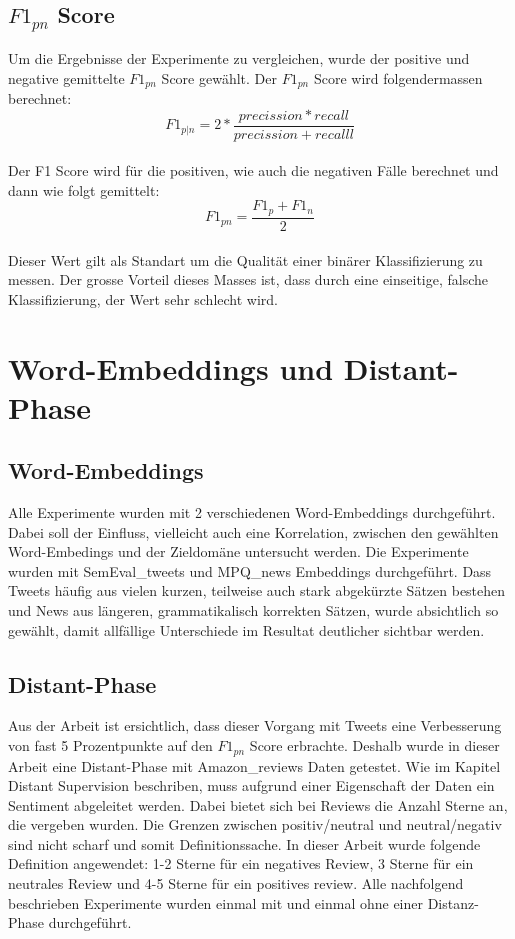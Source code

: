 \subsection{$F1_{pn}$ Score}
Um die Ergebnisse der Experimente zu vergleichen, wurde der positive und negative gemittelte $F1_{pn}$ Score gewählt. 
Der $F1_{pn}$ Score wird folgendermassen berechnet:\\
\begin{equation}
F1_{p|n} = 2*\frac{precission*recall}{precission+recalll}
\end{equation}\\
Der F1 Score wird für die positiven, wie auch die negativen Fälle berechnet und dann wie folgt gemittelt:\\
\begin{equation}
F1_{pn} = \frac{F1_p+F1_n}{2}
\end{equation}\\
Dieser Wert gilt als Standart um die Qualität einer binärer  Klassifizierung zu messen. Der grosse Vorteil dieses Masses ist, dass durch eine einseitige, falsche Klassifizierung, der Wert sehr schlecht wird.
\section{Word-Embeddings und Distant-Phase}
\subsection{Word-Embeddings}
Alle Experimente wurden mit 2 verschiedenen Word-Embeddings durchgeführt. Dabei soll der Einfluss, vielleicht auch eine Korrelation, zwischen den gewählten Word-Embedings und der Zieldomäne untersucht werden. Die Experimente wurden mit SemEval\_tweets und MPQ\_news Embeddings durchgeführt. Dass Tweets häufig aus vielen kurzen, teilweise auch stark abgekürzte Sätzen bestehen und News aus längeren, grammatikalisch korrekten Sätzen, wurde absichtlich so gewählt, damit allfällige Unterschiede im Resultat deutlicher sichtbar werden.
\subsection{Distant-Phase}
Aus der Arbeit \cite{deriu2016sentiment} ist ersichtlich, dass dieser Vorgang mit Tweets eine Verbesserung von fast 5 Prozentpunkte auf den $F1_{pn}$ Score erbrachte.
Deshalb wurde in dieser Arbeit eine Distant-Phase mit Amazon\_reviews Daten getestet. Wie im Kapitel Distant Supervision beschriben, muss aufgrund einer Eigenschaft der Daten ein Sentiment abgeleitet werden. Dabei bietet sich bei Reviews die Anzahl Sterne an, die vergeben wurden. Die Grenzen zwischen positiv/neutral und neutral/negativ sind nicht scharf und somit Definitionssache. In dieser Arbeit wurde folgende Definition angewendet: 1-2 Sterne für ein negatives Review, 3 Sterne für ein neutrales Review und 4-5 Sterne für ein positives review.
Alle nachfolgend beschrieben Experimente wurden einmal mit und einmal ohne einer Distanz-Phase durchgeführt.

